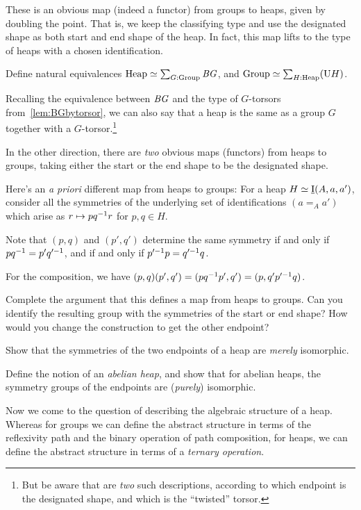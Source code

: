 These is an obvious map (indeed a functor) from groups to heaps,
given by doubling the point.
That is, we keep the classifying type and use the designated shape
as both start and end shape of the heap.
In fact, this map lifts to the type of heaps with a chosen identification.
\begin{exercise}\label{xca:group+torsor-heap}
  Define natural equivalences $\mathrm{Heap} \simeq \sum_{G:\mathrm{Group}}\mathit{B}\mathit{G}$,
  and $\mathrm{Group} \simeq \sum_{H:\mathrm{Heap}}(\mathrm{U} H)$.
\end{exercise}
Recalling the equivalence between $\mathit{B}\mathit{G}$ and the type of $G$-torsors
from~\cref{lem:BGbytorsor},
we can also say that a heap is the same
as a group $G$ together with a $G$-torsor.\footnote{%
  But be aware that are \emph{two} such descriptions,
  according to which endpoint is the designated shape,
  and which is the ``twisted'' torsor.}

In the other direction,
there are \emph{two} obvious maps (functors) from heaps to groups,
taking either the start or the end shape to be the designated shape.

Here's an \emph{a priori} different map from heaps to groups:
For a heap $H \jdeq \mkheap(A,a,a')$, consider all the
symmetries of the underlying set of identifications $(a=_Aa')$
which arise as $r \mapsto pq^{-1} r$ for $p,q\in H$.

Note that $(p,q)$ and $(p',q')$ determine the same symmetry
if and only if $pq^{-1} = p'q'^{-1}$, and if and only if
$p'^{-1}p = q'^{-1}q$.

For the composition, we have $(p,q)(p',q') = (pq^{-1}p',q') = (p,q'p'^{-1}q)$.

\begin{exercise}
  Complete the argument that this defines a map
  from heaps to groups. Can you identify the resulting group
  with the symmetries of the start or end shape?
  How would you change the construction to get the other endpoint?
\end{exercise}

\begin{exercise}
  Show that the symmetries of the two endpoints of a heap
  are \emph{merely} isomorphic.

  Define the notion of an \emph{abelian heap},
  and show that for abelian heaps,
  the symmetry groups of the endpoints are (\emph{purely}) isomorphic.
\end{exercise}

Now we come to the question of describing the algebraic structure
of a heap.
Whereas for groups we can define the abstract structure
in terms of the reflexivity path and the binary operation of path composition,
for heaps, we can define the abstract structure
in terms of a \emph{ternary operation}.

